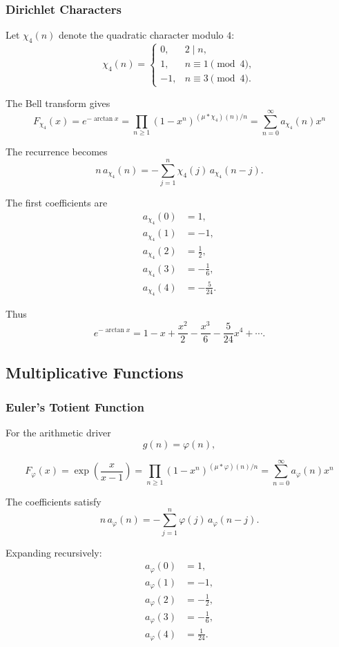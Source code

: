 \documentclass[11pt, a4paper]{article}
\theoremstyle{remark}
\begin{document}
\subsubsection{Dirichlet Characters}

Let \(\chi_4(n)\) denote the quadratic character modulo \(4\):
\[
\chi_4(n)
=
\begin{cases}
0,&2\mid n,\\
1,&n\equiv1\pmod4,\\
-1,&n\equiv3\pmod4.
\end{cases}
\]

The Bell transform gives
\[
F_{\chi_4}(x)
=
e^{-\arctan x}
=
\prod_{n\ge1}
(1-x^n)^{
(\mu*\chi_4)(n)/n
}=\sum_{n=0}^{\infty} a_{\chi_4}(n) x^n
\]

The recurrence becomes
\[
\boxed{
n\,a_{\chi_4}(n)
=
-\sum_{j=1}^n
\chi_4(j)\,a_{\chi_4}(n-j).
}
\]

The first coefficients are
\[
\begin{aligned}
a_{\chi_4}(0)&=1,\\
a_{\chi_4}(1)&=-1,\\
a_{\chi_4}(2)&=\frac12,\\
a_{\chi_4}(3)&=-\frac16,\\
a_{\chi_4}(4)&=-\frac5{24}.
\end{aligned}
\]

Thus
\[
e^{-\arctan x}
=
1-x+\frac{x^2}{2}-\frac{x^3}{6}
-\frac5{24}x^4+\cdots.
\]

\subsection{Multiplicative Functions}

\subsubsection{Euler's Totient Function}

For the arithmetic driver
\[
g(n)=\varphi(n),
\]

\[
F_\varphi(x)
=
\exp\!\left(
\frac{x}{x-1}
\right)
=
\prod_{n\ge1}
(1-x^n)^{
(\mu*\varphi)(n)/n
}=\sum_{n=0}^{\infty}a_\varphi(n)x^n\]

The coefficients satisfy
\[
\boxed{
n\,a_\varphi(n)
=
-\sum_{j=1}^n
\varphi(j)\,a_\varphi(n-j).
}
\]

Expanding recursively:
\[
\begin{aligned}
a_\varphi(0)&=1,\\
a_\varphi(1)&=-1,\\
a_\varphi(2)&=-\frac12,\\
a_\varphi(3)&=-\frac16,\\
a_\varphi(4)&=\frac1{24}.
\end{aligned}
\]
\end{document}
